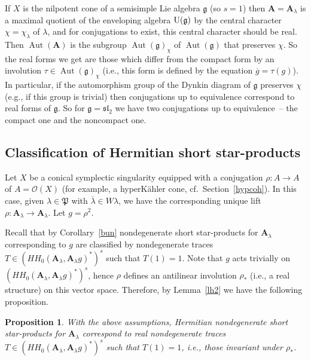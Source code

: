 \documentclass[pdftex]{sigma}
\numberwithin{equation}{section}
\newtheorem{Proposition}[Theorem]{Proposition}
\newcommand{\g}{\mathfrak{g}}
\begin{document}
\begin{Example} If $X$ is the nilpotent cone of a semisimple Lie algebra $\g$ (so $s=1$) then ${\mathbf A}={\mathbf A}_\lambda$ is a maximal quotient of the enveloping algebra ${\rm U}(\g)$ by the central character $\chi=\chi_\lambda$ of $\lambda$, and for conjugations to exist, this central character should be real. Then $\operatorname{Aut}({\mathbf A})$ is the subgroup $\operatorname{Aut}(\g)_\chi$ of $\operatorname{Aut}(\g)$ that preserves $\chi$. So the real forms we get are those which differ from the compact form by an involution $\tau\in \operatorname{Aut}(\g)_\chi$ (i.e., this form is defined by the equation $\overline{g}=\tau(g)$). In particular, if the automorphism group of the Dynkin diagram of $\g$ preserves $\chi$ (e.g., if this group is trivial) then conjugations up to equivalence correspond to real forms of $\g$. So for $\g=\mathfrak{sl}_2$ we have two conjugations up to equivalence~-- the compact one and the noncompact one.
\end{Example}

\subsection{Classification of Hermitian short star-products}

Let $X$ be a conical symplectic singularity equipped with a conjugation $\rho\colon A\to A$ of $A=\mathcal{O}(X)$ (for example, a hyperK\"ahler cone, cf.\ Section~\ref{hypcoh}). In this case, given $\lambda\in \mathfrak{P}$ with $\overline{\lambda}\in W\lambda$, we have the corresponding unique lift $\rho\colon {\mathbf A}_\lambda\to {\mathbf A}_\lambda$. Let $g=\rho^2$.

Recall that by Corollary~\ref{bun} nondegenerate short star-products for ${\mathbf A}_\lambda$ corresponding to $g$ are classified by nondegenerate traces $T\in (HH_0({\mathbf A}_\lambda,{\mathbf A}_\lambda g)^*)^s$ such that $T(1)=1$. Note that $g$ acts trivially on $(HH_0({\mathbf A}_\lambda,{\mathbf A}_\lambda g)^*)^s$, hence $\rho$ defines an antilinear involution $\rho_*$ (i.e., a real structure) on this vector space. Therefore, by Lemma~\ref{lh2} we have the following proposition.

\begin{Proposition} \label{hermi} With the above assumptions, Hermitian nondegenerate short star-products for ${\mathbf A}_\lambda$ correspond to real nondegenerate traces $T\in (HH_0({\mathbf A}_\lambda,{\mathbf A}_\lambda g)^*)^s$ such that $T(1)=1$, i.e., those invariant under $\rho_*$.
\end{Proposition}
\end{document}
